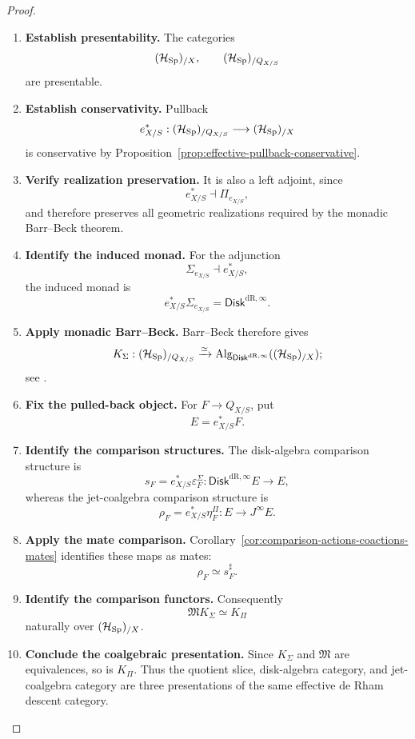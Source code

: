 \begin{proof}
\leavevmode
\begin{enumerate}[label=\textup{(\arabic*)}]
    \item \textbf{Establish presentability.}
The categories
\[
  (\mathcal H_{\operatorname{Sp}})_{/X},
  \qquad
  (\mathcal H_{\operatorname{Sp}})_{/Q_{X/S}}
\]
are presentable.

    \item \textbf{Establish conservativity.}
Pullback
\[
  e_{X/S}^*:
  (\mathcal H_{\operatorname{Sp}})_{/Q_{X/S}}
  \longrightarrow
  (\mathcal H_{\operatorname{Sp}})_{/X}
\]
is conservative by
Proposition~\ref{prop:effective-pullback-conservative}.

    \item \textbf{Verify realization preservation.}
It is also a left
adjoint, since
\[
  e_{X/S}^*\dashv\Pi_{e_{X/S}},
\]
and therefore preserves all geometric realizations required by the monadic
Barr--Beck theorem.

    \item \textbf{Identify the induced monad.}
For the adjunction
\[
  \Sigma_{e_{X/S}}\dashv e_{X/S}^*,
\]
the induced monad is
\[
  e_{X/S}^*\Sigma_{e_{X/S}}
  =
  \mathsf{Disk}^{\mathrm{dR},\infty}.
\]

    \item \textbf{Apply monadic Barr--Beck.}
Barr--Beck therefore gives
\[
  K_\Sigma:
  (\mathcal H_{\operatorname{Sp}})_{/Q_{X/S}}
  \xrightarrow{\simeq}
  \operatorname{Alg}_{\mathsf{Disk}^{\mathrm{dR},\infty}}
  ((\mathcal H_{\operatorname{Sp}})_{/X});
\]
see \cite[Theorem~4.7.3.5]{LurieHigherAlgebra}.

    \item \textbf{Fix the pulled-back object.}
For \(F\to Q_{X/S}\), put
\[
  E=e_{X/S}^*F.
\]

    \item \textbf{Identify the comparison structures.}
The disk-algebra comparison structure is
\[
  s_F
  =
  e_{X/S}^*\varepsilon^\Sigma_F:
  \mathsf{Disk}^{\mathrm{dR},\infty}E\to E,
\]
whereas the jet-coalgebra comparison structure is
\[
  \rho_F
  =
  e_{X/S}^*\eta^\Pi_F:
  E\to J^\infty E.
\]

    \item \textbf{Apply the mate comparison.}
Corollary~\ref{cor:comparison-actions-coactions-mates} identifies these maps as
mates:
\[
  \rho_F\simeq s_F^\sharp.
\]

    \item \textbf{Identify the comparison functors.}
Consequently
\[
  \mathfrak M K_\Sigma\simeq K_\Pi
\]
naturally over \((\mathcal H_{\operatorname{Sp}})_{/X}\).

    \item \textbf{Conclude the coalgebraic presentation.}
Since \(K_\Sigma\) and \(\mathfrak M\) are equivalences, so is \(K_\Pi\).
Thus the quotient slice, disk-algebra category, and jet-coalgebra category are
three presentations of the same effective de Rham descent category.
\end{enumerate}
\end{proof}

